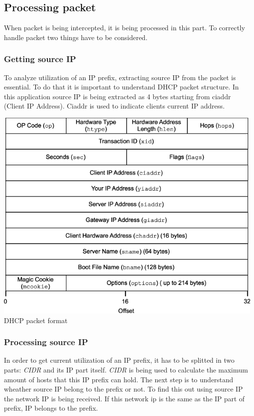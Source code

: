 \documentclass[english]{fitiel} %
\begin{document}
	\subsection{Processing packet}
	When packet is being intercepted, it is being processed in this part. To correctly handle packet two things have to be considered.
	
	\subsubsection{Getting source IP}
	To analyze utilization of an IP prefix, extracting source IP from the packet is essential. To do that it is important to understand DHCP packet structure.
	In this application source IP is being extracted as 4 bytes starting from ciaddr (Client IP Address). Ciaddr is used to 
	indicate clients current IP address.
		
	\begin{center}
		\includegraphics[scale=0.5]{Packet-format-for-DHCP.png}
		\\DHCP packet format\\
	\end{center}
	
	\subsubsection{Processing source IP}
	In order to get current utilization of an IP prefix, it has to be splitted in two parts: \emph{CIDR} and its IP part itself. 
	\emph{CIDR} is being used to calculate the maximum amount of hosts that this IP prefix can hold.
	The next step is to understand wheather source IP belong to the prefix or not. To find this out using source IP the network IP is being received.
	If this network ip is the same as the IP part of prefix, IP belongs to the prefix.
\end{document}
